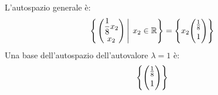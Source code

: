 \documentclass[a4paper]{article}
\makeatletter
\newenvironment{rowequmat}[1]{\left(\array{@{}#1@{}}}{\endarray\right)}
\makeatother
\begin{document}
	L'autospazio generale è:
	\begin{equation*}
		\left\{ \left. \begin{rowequmat}{c}
			\dfrac{1}{8}x_{2} \\ [.3em]
			x_{2}
		\end{rowequmat} \: \right| \: x_{2} \in \mathbb{R}\right\} =
		\left\{
			x_{2}
			\begin{rowequmat}{c}
				\frac{1}{8} \\ [.3em]
				1
			\end{rowequmat}
		\right\}
	\end{equation*}
	Una base dell'autospazio dell'autovalore $\lambda=1$ è:
	\begin{equation*}
		\left\{\begin{rowequmat}{c}
			\frac{1}{8} \\ [.3em]
			1
		\end{rowequmat}\right\}
	\end{equation*}\newpage
\end{document}
